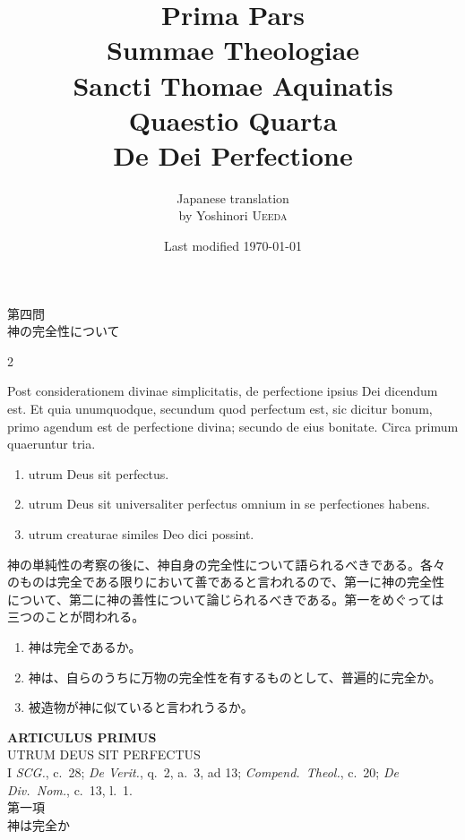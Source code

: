 \documentclass[paper=a4paper,fontsize=10pt,jafontsize=9pt,titlepage]{jlreq}
\title{{\bfseries Prima Pars}\\{\Huge Summae Theologiae}\\Sancti Thomae
Aquinatis\\Quaestio Quarta\\{\bfseries De Dei Perfectione}}
\author{Japanese translation\\by Yoshinori {\scshape Ueeda}}
\date{Last modified \today}
\begin{document}
\maketitle
\begin{center}
 {\Large 第四問\\神の完全性について}
\end{center}

\begin{paracol}{2}

Post considerationem divinae simplicitatis, de perfectione ipsius Dei
 dicendum est. Et quia unumquodque, secundum quod perfectum est, sic
 dicitur bonum, primo agendum est de perfectione divina; secundo de eius
 bonitate. Circa primum quaeruntur tria. 
\begin{enumerate}
 \item utrum Deus sit perfectus.
 \item utrum Deus sit universaliter perfectus omnium in se
 perfectiones habens.
 \item utrum creaturae similes Deo dici possint.
\end{enumerate}

\switchcolumn

神の単純性の考察の後に、神自身の完全性について語られるべきである。各々
のものは完全である限りにおいて善であると言われるので、第一に神の完全性
について、第二に神の善性について論じられるべきである。第一をめぐっては
三つのことが問われる。
\begin{enumerate}
 \item 神は完全であるか。
 \item 神は、自らのうちに万物の完全性を有するものとして、普遍的に完全か。
 \item 被造物が神に似ていると言われうるか。
\end{enumerate}

\end{paracol}

\newpage
{}
{}
\setcounter{section}{1}
\setcounter{subsection}{0}
\begin{center}
 {\Large {\bfseries ARTICULUS PRIMUS}}\\
 {\large UTRUM DEUS SIT PERFECTUS}\\
 {\footnotesize I {\itshape SCG.}, c.~28; {\itshape De Verit.}, q.~2,
 a.~3, ad 13; {\itshape Compend.~Theol.}, c.~20; {\itshape De
 Div.~Nom.}, c.~13, l.~1.}\\
 {\Large 第一項\\神は完全か}
\end{center}
\end{document}
